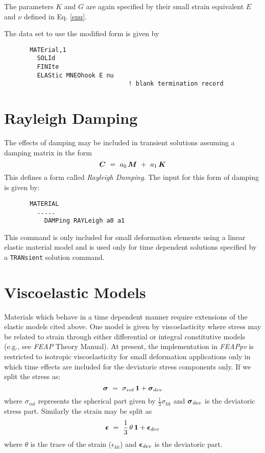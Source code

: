 The parameters $K$ and $G$ are again specified by their small strain
equivalent $E$ and $\nu$ defined in Eq. \ref{enu}.

The data set to use the modified form is given by
\begin{verbatim}
       MATErial,1
         SOLId
         FINIte
         ELAStic MNEOhook E nu
                                  ! blank termination record
\end{verbatim}

\section{Rayleigh Damping}
\label{raydamp}

The effects of damping may be included in transient solutions
assuming a damping matrix in the form
\begin{equation}
\boldsymbol{C} ~=~ a_0 \, \boldsymbol{M} ~+~ a_1 \, \boldsymbol{K}
\end{equation}
This defines a form called {\it Rayleigh Damping}.
The input for this form of damping is given by:
\begin{verbatim}
       MATERIAL
         .....
           DAMPing RAYLeigh a0 a1
\end{verbatim}

This command is only included for small deformation elements using a
linear elastic material model and is used only for
time dependent solutions specified by a {\tt TRANsient} solution command.

\section{Viscoelastic Models}
\label{viscmod}

Materials which behave in a time dependent manner require extensions of the
elastic models cited above.  One model is given by viscoelasticity where
stress may be related to strain through either differential or integral
constitutive models (e.g., see {\sl FEAP} Theory Manual).  At present, the
implementation in {\sl FEAPpv} is restricted to isotropic viscoelasticity for
small deformation applications only in
which time effects are included for the deviatoric stress components only.
If we split the stress as:
\begin{equation}
\boldsymbol{\sigma} ~=~ \sigma_{vol} \, \boldsymbol{1} + \boldsymbol{\sigma}_{dev}
\end{equation}
where $\sigma_{vol}$ represents the spherical part given by
$\frac{1}{3} \sigma_{kk}$ and $\boldsymbol{\sigma}_{dev}$ is the deviatoric stress part.
Similarly the strain may be split as
\begin{equation}
\boldsymbol{\epsilon} ~=~ \frac{1}{3} \, \theta \, \boldsymbol{1} + \boldsymbol{\epsilon}_{dev}
\end{equation}
where $\theta$ is the trace of the strain ($\epsilon_{kk}$)
and $\boldsymbol{\epsilon}_{dev}$ is the deviatoric part.

